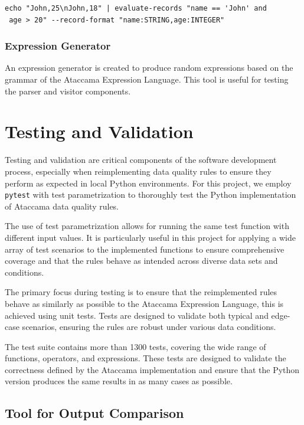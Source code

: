 \begin{verbatim}
echo "John,25\nJohn,18" | evaluate-records "name == 'John' and
 age > 20" --record-format "name:STRING,age:INTEGER"
\end{verbatim}

\subsubsection{Expression Generator}

An expression generator is created to produce random expressions based on the grammar of the Ataccama Expression Language. This tool is useful for testing the parser and visitor components.

\section{Testing and Validation}

Testing and validation are critical components of the software development process, especially when reimplementing data quality rules to ensure they perform as expected in local Python environments. For this project, we employ \texttt{pytest} with test parametrization to thoroughly test the Python implementation of Ataccama data quality rules.

The use of test parametrization allows for running the same test function with different input values. It is particularly useful in this project for applying a wide array of test scenarios to the implemented functions to ensure comprehensive coverage and that the rules behave as intended across diverse data sets and conditions.

The primary focus during testing is to ensure that the reimplemented rules behave as similarly as possible to the Ataccama Expression Language, this is achieved using unit tests. Tests are designed to validate both typical and edge-case scenarios, ensuring the rules are robust under various data conditions.

The test suite contains more than 1300 tests, covering the wide range of functions, operators, and expressions. These tests are designed to validate the correctness defined by the Ataccama implementation and ensure that the Python version produces the same results in as many cases as possible.

\subsection{Tool for Output Comparison}

